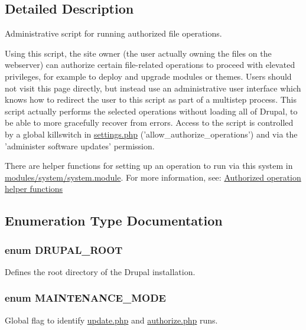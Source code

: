 \subsection{Detailed Description}
Administrative script for running authorized file operations.

Using this script, the site owner (the user actually owning the files on the webserver) can authorize certain file-\/related operations to proceed with elevated privileges, for example to deploy and upgrade modules or themes. Users should not visit this page directly, but instead use an administrative user interface which knows how to redirect the user to this script as part of a multistep process. This script actually performs the selected operations without loading all of Drupal, to be able to more gracefully recover from errors. Access to the script is controlled by a global killswitch in \hyperlink{settings_8php}{settings.php} ('allow\_\-authorize\_\-operations') and via the 'administer software updates' permission.

There are helper functions for setting up an operation to run via this system in \hyperlink{system_8module}{modules/system/system.module}. For more information, see: \hyperlink{group__authorize}{Authorized operation helper functions } 

\subsection{Enumeration Type Documentation}
\hypertarget{authorize_8php_a21cf187d162beffb1fbc5a1d1098f4f9}{
\subsubsection[{DRUPAL\_\-ROOT}]{\setlength{\rightskip}{0pt plus 5cm}enum {\bf DRUPAL\_\-ROOT}}}
\label{authorize_8php_a21cf187d162beffb1fbc5a1d1098f4f9}
Defines the root directory of the Drupal installation. \hypertarget{authorize_8php_a5bf6dfe9ba7ee16c648e3932aa76535d}{
\subsubsection[{MAINTENANCE\_\-MODE}]{\setlength{\rightskip}{0pt plus 5cm}enum {\bf MAINTENANCE\_\-MODE}}}
\label{authorize_8php_a5bf6dfe9ba7ee16c648e3932aa76535d}
Global flag to identify \hyperlink{update_8php}{update.php} and \hyperlink{authorize_8php}{authorize.php} runs.

